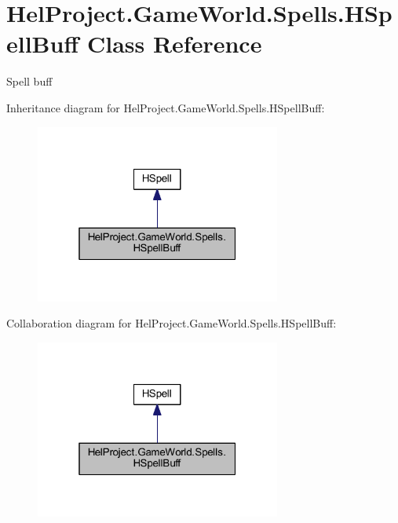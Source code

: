 \hypertarget{class_hel_project_1_1_game_world_1_1_spells_1_1_h_spell_buff}{}\section{Hel\+Project.\+Game\+World.\+Spells.\+H\+Spell\+Buff Class Reference}
\label{class_hel_project_1_1_game_world_1_1_spells_1_1_h_spell_buff}


Spell buff  




Inheritance diagram for Hel\+Project.\+Game\+World.\+Spells.\+H\+Spell\+Buff\+:\nopagebreak
\begin{figure}[H]
\begin{center}
\leavevmode
\includegraphics[width=229pt]{class_hel_project_1_1_game_world_1_1_spells_1_1_h_spell_buff__inherit__graph}
\end{center}
\end{figure}


Collaboration diagram for Hel\+Project.\+Game\+World.\+Spells.\+H\+Spell\+Buff\+:\nopagebreak
\begin{figure}[H]
\begin{center}
\leavevmode
\includegraphics[width=229pt]{class_hel_project_1_1_game_world_1_1_spells_1_1_h_spell_buff__coll__graph}
\end{center}
\end{figure}
